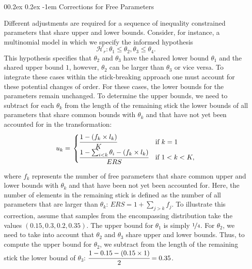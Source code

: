 \documentclass[
  english,
  man,floatsintext]{apa6}
\makeatletter
\let\oldparagraph\paragraph
\renewcommand{\paragraph}[1]{\oldparagraph{#1}\mbox{}}
\renewcommand{\paragraph}{\@startsection{paragraph}{4}{\parindent}%
  {0\baselineskip \@plus 0.2ex \@minus 0.2ex}%
  {-1em}%
  {\normalfont\normalsize\bfseries\itshape\typesectitle}}
\makeatother
\begin{document}
\begin{appendix}
\hypertarget{corrections-for-free-parameters}{%
\paragraph{Corrections for Free
Parameters}\label{corrections-for-free-parameters}}

Different adjustments are required for a sequence of inequality
constrained parameters that share upper and lower bounds. Consider, for
instance, a multinomial model in which we specify the informed
hypothesis
\[\mathcal{H}_r: \theta_1 \leq \theta_2, \theta_3 \leq \theta_4.\] This
hypothesis specifies that \(\theta_2\) and \(\theta_3\) have the shared
lower bound \(\theta_1\) and the shared upper bound \(1\), however,
\(\theta_2\) can be larger than \(\theta_3\) or vice versa. To integrate
these cases within the stick-breaking approach one must account for
these potential changes of order. For these cases, the lower bounds for
the parameters remain unchanged. To determine the upper bounds, we need
to subtract for each \(\theta_k\) from the length of the remaining stick
the lower bounds of all parameters that share common bounds with
\(\theta_k\) and that have not yet been accounted for in the
transformation: \begin{align}
u_k = \left.
\begin{cases}
\cfrac{1 - (f_k \times l_k)}{K} & \text{if } k = 1 \\
\cfrac{1 - \sum_{i < k} \theta_i - (f_k \times l_k)}{ERS} & \text{if } 1 < k < K,
\end{cases}
\right.
\end{align}

where \(f_k\) represents the number of free parameters that share common
upper and lower bounds with \(\theta_k\) and that have been not yet been
accounted for. Here, the number of elements in the remaining stick is
defined as the number of all parameters that are larger than
\(\theta_k\): \(ERS = 1 + \sum_{j > k} f_j\). To illustrate this
correction, assume that samples from the encompassing distribution take
the values \((0.15, 0.3, 0.2, 0.35)\). The upper bound for \(\theta_1\)
is simply \(\nicefrac{1}{4}\). For \(\theta_2\), we need to take into
account that \(\theta_2\) and \(\theta_3\) share upper and lower bounds.
Thus, to compute the upper bound for \(\theta_2\), we subtract from the
length of the remaining stick the lower bound of \(\theta_3\):
\(\cfrac{1 - 0.15 - (0.15 \times 1)}{2} = 0.35\).


\end{appendix}
\end{document}
